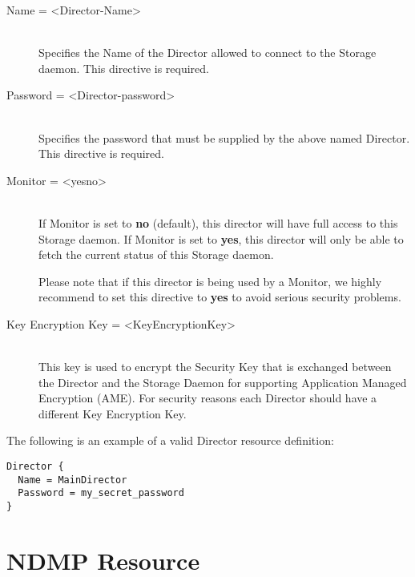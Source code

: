 \begin{description}

\item [Name = {\textless}Director-Name{\textgreater}] \hfill \\
Specifies the Name of the Director allowed to connect  to the Storage daemon.
This directive is required.

\item [Password = {\textless}Director-password{\textgreater}] \hfill \\
Specifies the password that must be supplied by the above named  Director.
This directive is required.

\item [Monitor = {\textless}yes{\textbar}no{\textgreater}] \hfill \\
If Monitor is set to {\bf no} (default), this director will have full
access to this Storage daemon.  If Monitor is set to {\bf yes}, this
director will only be able to fetch the current status of this Storage
daemon.

Please note that if this director is being used by a Monitor, we highly
recommend to set this directive to {\bf yes} to avoid serious security
problems.

\item [Key Encryption Key = {\textless}KeyEncryptionKey{\textgreater}] \hfill \\
This key is used to encrypt the Security Key that is exchanged between
the Director and the Storage Daemon for supporting Application Managed
Encryption (AME). For security reasons each Director should have a
different Key Encryption Key.

\end{description}

The following is an example of a valid Director resource definition:

\footnotesize
\begin{verbatim}
Director {
  Name = MainDirector
  Password = my_secret_password
}
\end{verbatim}
\normalsize

\label{NDMPResource}
\section{NDMP Resource}

